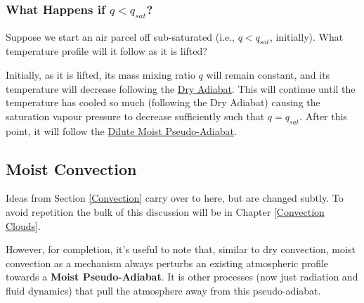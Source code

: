 \subsubsection{What Happens if \(q<q_{sat}\)?}

Suppose we start an air parcel off sub-saturated (i.e., \(q<q_{sat}\), initially). What temperature profile will it follow as it is lifted? 

Initially, as it is lifted, its mass mixing ratio \(q\) will remain constant, and its temperature will decrease following the \hyperref[Dry Adiabat]{Dry Adiabat}. This will continue until the temperature has cooled so much (following the Dry Adiabat) causing the saturation vapour pressure to decrease sufficiently such that \(q=q_{sat}\). After this point, it will follow the \hyperref[dilute moist adiabat]{Dilute Moist Pseudo-Adiabat}.

\subsection{Moist Convection}

Ideas from Section \ref{Convection} carry over to here, but are changed subtly. To avoid repetition the bulk of this discussion will be in Chapter \ref{Convection Clouds}.

However, for completion, it's useful to note that, similar to dry convection, moist convection as a mechanism always perturbs an existing atmospheric profile towards a \textbf{Moist Pseudo-Adiabat}. It is other processes (now just radiation and fluid dynamics) that pull the atmosphere away from this pseudo-adiabat.

\printendnotes